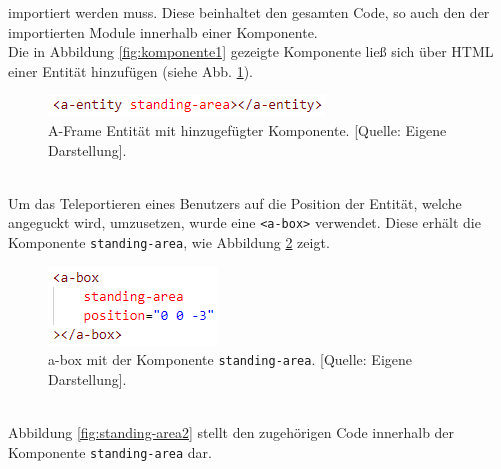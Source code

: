 \documentclass[a4paper,12pt,oneside]{article}
\begin{document}
        importiert werden muss. Diese beinhaltet den gesamten Code, so auch den
        der importierten Module innerhalb einer Komponente. \\
        Die in Abbildung \ref{fig:komponente1} gezeigte Komponente ließ
        sich über HTML einer Entität hinzufügen (siehe Abb. \ref{fig:komponente2}).
        \begin{figure}[h]
          \centering
          \includegraphics{img/coding/komponente2.png}
          \caption[A-Frame Entität mit hinzugefügter Komponente.]{A-Frame Entität mit hinzugefügter Komponente. [Quelle: Eigene Darstellung].}
          \label{fig:komponente2}
        \end{figure} \\
        Um das Teleportieren eines Benutzers auf die Position der Entität, 
        welche angeguckt wird, umzusetzen, wurde eine \texttt{<a-box>}
        verwendet. Diese erhält die Komponente \texttt{standing-area},
        wie Abbildung \ref{fig:standing-area1} zeigt.
        \begin{figure}[h]
          \centering
          \includegraphics{img/coding/standing-area1.png}
          \caption[a-box mit der Komponente \texttt{standing-area}.]{a-box mit der Komponente \texttt{standing-area}. [Quelle: Eigene Darstellung].}
          \label{fig:standing-area1}
        \end{figure} \\
        Abbildung \ref{fig:standing-area2} stellt den zugehörigen Code
        innerhalb der Komponente \texttt{standing-area} dar.
\end{document}
